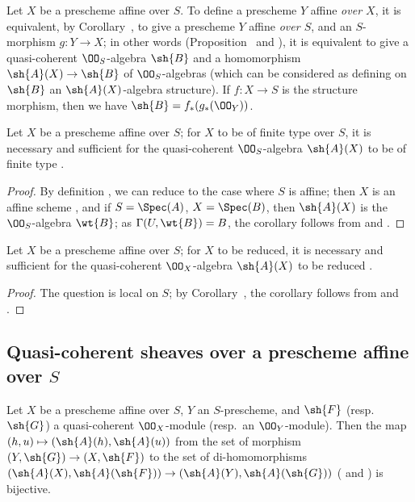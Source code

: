 \begin{env}[1.3.6]
\label{2.1.3.6}
Let $X$ be a prescheme affine over $S$.
To define a prescheme $Y$ affine \emph{over $X$}, it is equivalent, by Corollary~, to give a prescheme $Y$ affine \emph{over $S$}, and an $S$-morphism $g:Y\to X$; in other words (Proposition~ and ), it is equivalent to give a quasi-coherent $\OO_S$-algebra $\sh{B}$ and a homomorphism $\sh{A}(X)\to\sh{B}$ of $\OO_S$-algebras (which can be considered as defining on $\sh{B}$ an $\sh{A}(X)$-algebra structure).
If $f:X\to S$ is the structure morphism, then we have $\sh{B}=f_*(g_*(\OO_Y))$.
\end{env}

\begin{cor}[1.3.7]
\label{2.1.3.7}
Let $X$ be a prescheme affine over $S$; for $X$ to be of finite type over $S$, it is necessary and sufficient for the quasi-coherent $\OO_S$-algebra $\sh{A}(X)$ to be of finite type .
\end{cor}

\begin{proof}
\label{proof-2.1.3.7}
By definition , we can reduce to the case where $S$ is affine; then $X$ is an affine scheme , and if $S=\Spec(A)$, $X=\Spec(B)$, then $\sh{A}(X)$ is the $\OO_S$-algebra $\wt{B}$; as $\Gamma(U,\wt{B})=B$, the corollary follows from  and .
\end{proof}

\begin{cor}[1.3.8]
\label{2.1.3.8}
Let $X$ be a prescheme affine over $S$; for $X$ to be reduced, it is necessary and sufficient for the quasi-coherent $\OO_X$-algebra $\sh{A}(X)$ to be reduced .
\end{cor}

\begin{proof}
\label{proof-2.1.3.8}
The question is local on $S$; by Corollary~, the corollary follows from  and .
\end{proof}

\subsection{Quasi-coherent sheaves over a prescheme affine over $S$}
\label{subsection:quasi-coherent-sheaves-on-prescheme-affine-over}

\begin{prop}[1.4.1]
\label{2.1.4.1}
Let $X$ be a prescheme affine over $S$, $Y$ an $S$-prescheme, and $\sh{F}$ (resp.~$\sh{G}$) a quasi-coherent $\OO_X$-module (resp.~an $\OO_Y$-module).
Then the map $(h,u)\mapsto(\sh{A}(h),\sh{A}(u))$ from the set of morphism $(Y,\sh{G})\to(X,\sh{F})$ to the set of di-homomorphisms $(\sh{A}(X),\sh{A}(\sh{F}))\to(\sh{A}(Y),\sh{A}(\sh{G}))$ ( and ) is bijective.
\end{prop}


